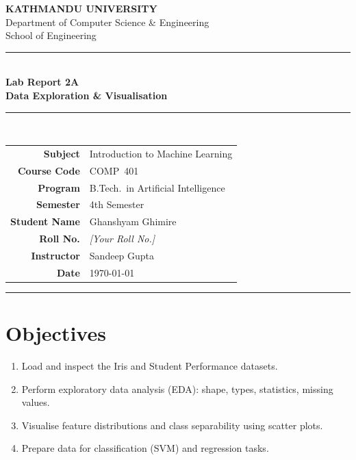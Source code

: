 \documentclass[12pt,a4paper]{article}
\begin{document}
\begin{center}
  {\Large\bfseries\color{kuBlue} KATHMANDU UNIVERSITY}\\[4pt]
  {\normalsize Department of Computer Science \& Engineering}\\[2pt]
  {\normalsize School of Engineering}\\[10pt]
  \rule{\linewidth}{1.5pt}\\[6pt]
  {\large\bfseries Lab Report 2A}\\[4pt]
  {\LARGE\bfseries Data Exploration \& Visualisation}\\[4pt]
  \rule{\linewidth}{0.8pt}\\[10pt]
\end{center}

\begin{center}
\renewcommand{\arraystretch}{1.4}
\begin{tabular}{r l}
  \textbf{Subject}      & Introduction to Machine Learning \\
  \textbf{Course Code}  & COMP~401 \\
  \textbf{Program}      & B.Tech.\ in Artificial Intelligence \\
  \textbf{Semester}     & 4th Semester \\
  \textbf{Student Name} & Ghanshyam Ghimire \\
  \textbf{Roll No.}     & \textit{[Your Roll No.]} \\
  \textbf{Instructor}   & Sandeep Gupta \\
  \textbf{Date}         & \today \\
\end{tabular}
\end{center}
\vspace{10pt}\hrule\vspace{16pt}

\section{Objectives}
\begin{enumerate}[label=\arabic*.]
  \item Load and inspect the Iris and Student Performance datasets.
  \item Perform exploratory data analysis (EDA): shape, types, statistics, missing values.
  \item Visualise feature distributions and class separability using scatter plots.
  \item Prepare data for classification (SVM) and regression tasks.
\end{enumerate}
\end{document}
